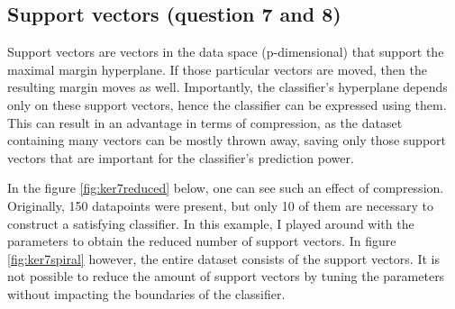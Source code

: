 \documentclass[11pt, a4paper]{article}
\begin{document}
\subsection{Support vectors (question 7 and 8)}

Support vectors are vectors in the data space (p-dimensional) that
support the maximal margin hyperplane. If those particular vectors are
moved, then the resulting margin moves as well. Importantly, the
classifier's hyperplane depends only on these support vectors, hence
the classifier can be expressed using them. This can result in an
advantage in terms of compression, as the dataset containing many
vectors can be mostly thrown away, saving only those support vectors
that are important for the classifier's prediction power.

In the figure \ref{fig:ker7reduced} below, one can see such an effect of
compression. Originally, 150 datapoints were present, but only 10 of
them are necessary to construct a satisfying classifier. In this
example, I played around with the parameters to obtain the reduced
number of support vectors. In figure \ref{fig:ker7spiral} however, the
entire dataset consists of the support vectors. It is not possible to
reduce the amount of support vectors by tuning the parameters without
impacting the boundaries of the classifier.
\end{document}
